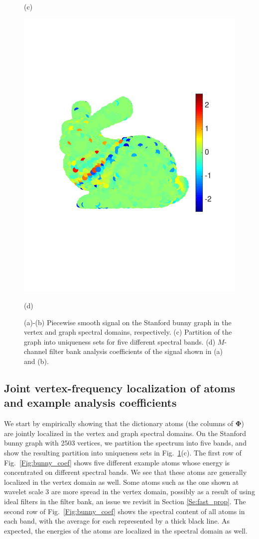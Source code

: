 \documentclass[journal, 10pt]{IEEEtran}
\begin{document}
\begin{figure}[tbh]
\begin{minipage}[m]{0.48\linewidth}
\centerline{\small{(c)}}
\end{minipage}
\begin{minipage}[m]{0.48\linewidth}
\centerline{\includegraphics[width=.8\linewidth]{fig_bunny_coef_all}}
\centerline{\small{(d)}}
\end{minipage}
\caption{(a)-(b) Piecewise smooth signal on the Stanford bunny graph \cite{bunny} in the vertex and graph spectral domains, respectively. (c) Partition of the graph into uniqueness sets for five different spectral bands. (d) $M$-channel filter bank analysis coefficients of the signal shown in (a) and (b).}\label{Fig:bunny_signal}
\end{figure}

\subsection{Joint vertex-frequency localization of atoms and example analysis coefficients}
We start by empirically showing that the dictionary atoms (the columns of $\boldsymbol{\Phi}$) are jointly localized in the vertex and graph spectral domains. On the Stanford bunny graph \cite{bunny} with 2503 vertices, we partition the spectrum into five bands, and show the resulting partition into uniqueness sets 
in Fig.\ \ref{Fig:bunny_signal}(c). The first row of Fig.\ \ref{Fig:bunny_coef} shows five different example atoms whose energy is concentrated on different spectral bands. We see that these atoms are generally localized in the vertex domain as well. Some atoms such as the one shown at wavelet scale 3 are more spread in the vertex domain, possibly as a result of using ideal filters in the filter bank, an issue we revisit in Section \ref{Se:fast_prop}. The second row of Fig.\ \ref{Fig:bunny_coef} shows the spectral content of all atoms in each band, with the average for each represented by a thick black line. As expected, the energies of the atoms are localized in the spectral domain as well. 
\end{document}
